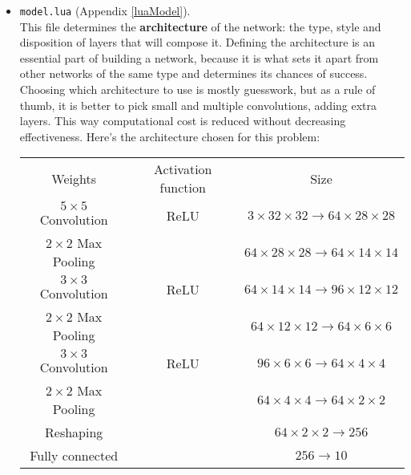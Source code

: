 \documentclass[titlepage]{article}
\theoremstyle{plain}
\theoremstyle{definition}
\begin{document}
\begin{itemize}
			\item \texttt{model.lua} (Appendix \ref{luaModel}).\\
			This file determines the \textbf{architecture} of the network: the type, style and disposition of layers that will compose it. Defining the architecture is an essential part of building a network, because it is what sets it apart from other networks of the same type and determines its chances of success. Choosing which architecture to use is mostly guesswork, but as a rule of thumb, it is better to pick small and multiple convolutions, adding extra layers. This way computational cost is reduced without decreasing effectiveness. Here's the architecture chosen for this problem:
			\begin{center}
				\begin{tabular}{||c|c c||}
					\hline
					Weights & Activation function & Size \\
					$5\times5$ Convolution & ReLU & $3\times32\times32 \to 64\times28\times28$ \\
					$2\times2$ Max Pooling &  & $64\times28\times28 \to 64\times14\times14$ \\
					$3\times3$ Convolution & ReLU & $64\times14\times14 \to 96\times12\times12$ \\
					$2\times2$ Max Pooling &  & $64\times12\times12 \to 64\times6\times6$ \\
					$3\times3$ Convolution & ReLU & $96\times6\times6 \to 64\times4\times4$ \\
					$2\times2$ Max Pooling &  & $64\times4\times4 \to 64\times2\times2$ \\
					\hline
					Reshaping & & $64\times2\times2 \to 256$ \\
					Fully connected & & $256 \to 10$ \\
					\hline
				\end{tabular}
			\end{center}
			

\end{itemize}
\end{document}
